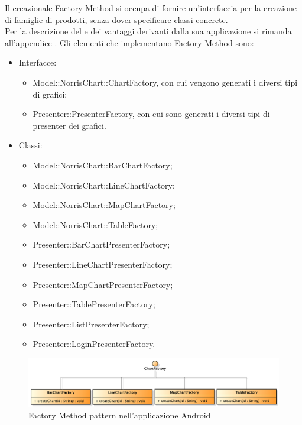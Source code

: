                 
            Il  creazionale Factory Method si occupa di fornire un'interfaccia per la creazione di famiglie di prodotti, senza dover specificare classi concrete. \\
            Per la descrizione del  e dei vantaggi derivanti dalla sua applicazione si rimanda all'appendice .
                Gli elementi che implementano Factory Method sono:
                \begin{itemize}
                \item Interfacce:
                    \begin{itemize}
                        \item Model::NorrisChart::ChartFactory, con cui vengono generati i diversi tipi di grafici;
                        \item Presenter::PresenterFactory, con cui sono generati i diversi tipi di presenter dei grafici.
                    \end{itemize}
                \item Classi:
                    \begin{itemize}
                        \item Model::NorrisChart::BarChartFactory;
                        \item Model::NorrisChart::LineChartFactory;
                        \item Model::NorrisChart::MapChartFactory;
                        \item Model::NorrisChart::TableFactory;
                        \item Presenter::BarChartPresenterFactory;
                        \item Presenter::LineChartPresenterFactory;
                        \item Presenter::MapChartPresenterFactory;
                        \item Presenter::TablePresenterFactory;
                        \item Presenter::ListPresenterFactory;
                        \item Presenter::LoginPresenterFactory.
                    \end{itemize}
                \end{itemize}
                \begin{figure}[H]\centering
	        		\includegraphics[width=\textwidth]{SpecificaTecnica/Pics/DesignPatternNorris/Factory2}
	        		\caption{Factory Method pattern nell'applicazione Android}
	    		\end{figure}
